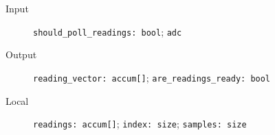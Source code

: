 \begin{flushleft}
  \begin{description}
    \item [Input]
      \verb#should_poll_readings: bool#;
      \verb#adc#
    \item [Output]
      \verb#reading_vector: accum[]#;
      \verb#are_readings_ready: bool#
    \item [Local]
      \verb#readings: accum[]#;
      \verb#index: size#;
      \verb#samples: size#
  \end{description}
\end{flushleft}
